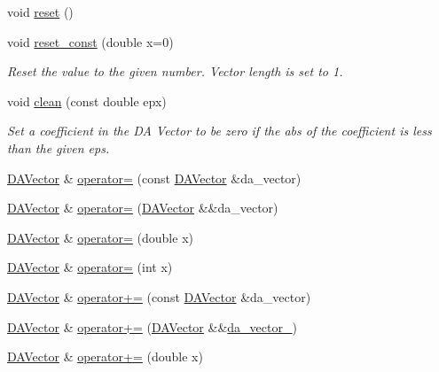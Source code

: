 \begin{DoxyCompactItemize}
void \mbox{\hyperlink{struct_d_a_vector_a0c85003e3b334ca94135b4874c36f7e3}{reset}} ()
\item 
void \mbox{\hyperlink{struct_d_a_vector_a104928f5ba59b6ce42636646670048c4}{reset\+\_\+const}} (double x=0)
\begin{DoxyCompactList}\small\item\em Reset the value to the given number. Vector length is set to 1. \end{DoxyCompactList}\item 
void \mbox{\hyperlink{struct_d_a_vector_a0afc5d4068338660737f5132caedce6c}{clean}} (const double epx)
\begin{DoxyCompactList}\small\item\em Set a coefficient in the DA Vector to be zero if the abs of the coefficient is less than the given eps. \end{DoxyCompactList}\item 
\mbox{\hyperlink{struct_d_a_vector}{D\+A\+Vector}} \& \mbox{\hyperlink{struct_d_a_vector_a97e8151a620dabaec3ea3d817cfa62b8}{operator=}} (const \mbox{\hyperlink{struct_d_a_vector}{D\+A\+Vector}} \&da\+\_\+vector)
\item 
\mbox{\hyperlink{struct_d_a_vector}{D\+A\+Vector}} \& \mbox{\hyperlink{struct_d_a_vector_a94691d8c67e45550f23b6560ad7f9a7d}{operator=}} (\mbox{\hyperlink{struct_d_a_vector}{D\+A\+Vector}} \&\&da\+\_\+vector)
\item 
\mbox{\hyperlink{struct_d_a_vector}{D\+A\+Vector}} \& \mbox{\hyperlink{struct_d_a_vector_ad918757f17d0e69d88faf409fa3e68d6}{operator=}} (double x)
\item 
\mbox{\hyperlink{struct_d_a_vector}{D\+A\+Vector}} \& \mbox{\hyperlink{struct_d_a_vector_a07a4cac6079ac29055d8d68a87ae3ffe}{operator=}} (int x)
\item 
\mbox{\hyperlink{struct_d_a_vector}{D\+A\+Vector}} \& \mbox{\hyperlink{struct_d_a_vector_afdf543a11ce6aa68ea01237f80b1eb17}{operator+=}} (const \mbox{\hyperlink{struct_d_a_vector}{D\+A\+Vector}} \&da\+\_\+vector)
\item 
\mbox{\hyperlink{struct_d_a_vector}{D\+A\+Vector}} \& \mbox{\hyperlink{struct_d_a_vector_ac506591d2371fad34a78092932452c8e}{operator+=}} (\mbox{\hyperlink{struct_d_a_vector}{D\+A\+Vector}} \&\&\mbox{\hyperlink{struct_d_a_vector_a359a2e0b8e48c6e481b48b5972e7631c}{da\+\_\+vector\+\_\+}})
\item 
\mbox{\hyperlink{struct_d_a_vector}{D\+A\+Vector}} \& \mbox{\hyperlink{struct_d_a_vector_ad2e0b5e4810812a426c15313d012eaa0}{operator+=}} (double x)

\end{DoxyCompactItemize}
